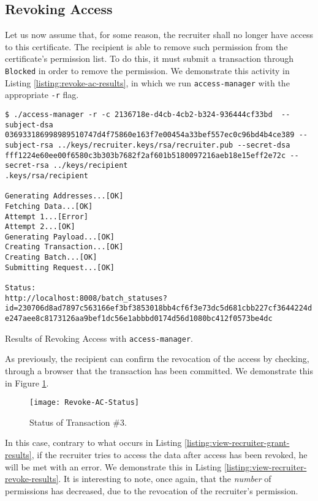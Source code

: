 \subsection{Revoking Access}
\label{sec:impl-revoke-ac}

Let us now assume that, for some reason, the recruiter shall no longer have access to this certificate. The recipient is able to remove such permission from the certificate's permission list. To do this, it must submit a transaction through \texttt{Blocked} in order to remove the permission. We demonstrate this activity in Listing \ref{listing:revoke-ac-results}, in which we run \texttt{access-manager} with the appropriate \texttt{-r} flag.

\begin{listing}[ht]
	\begin{verbatim}
$ ./access-manager -r -c 2136718e-d4cb-4cb2-b324-936444cf33bd  --subject-dsa 036933186998989510747d4f75860e163f7e00454a33bef557ec0c96bd4b4ce389 --subject-rsa ../keys/recruiter.keys/rsa/recruiter.pub --secret-dsa fff1224e60ee00f6580c3b303b7682f2af601b5180097216aeb18e15eff2e72c --secret-rsa ../keys/recipient
.keys/rsa/recipient

Generating Addresses...[OK]
Fetching Data...[OK]
Attempt 1...[Error]
Attempt 2...[OK]
Generating Payload...[OK]
Creating Transaction...[OK]
Creating Batch...[OK]
Submitting Request...[OK]

Status:
http://localhost:8008/batch_statuses?id=230706d8ad7897c563166ef3bf3853018bb4cf6f3e73dc5d681cbb227cf3644224d
e247aee8c8173126aa9bef1dc56e1abbbd0174d56d1080bc412f0573be4dc
\end{verbatim}
	\caption{Results of Revoking Access with \texttt{access-manager}.}
	\label{listing:revoke-ac-results}
\end{listing}

As previously, the recipient can confirm the revocation of the access by checking, through a browser that the transaction has been committed. We demonstrate this in Figure \ref{fig:revoke-ac-status}.

\begin{figure}[htb]
	\centering
	\texttt{[image: Revoke-AC-Status]}
	\caption{Status of Transaction \#3.}
	\label{fig:revoke-ac-status}
\end{figure}

In this case, contrary to what occurs in Listing \ref{listing:view-recruiter-grant-results}, if the recruiter tries to access the data after access has been revoked, he will be met with an error. We demonstrate this in Listing \ref{listing:view-recruiter-revoke-results}. It is interesting to note, once again, that the \emph{number} of permissions has decreased, due to the revocation of the recruiter's permission.

